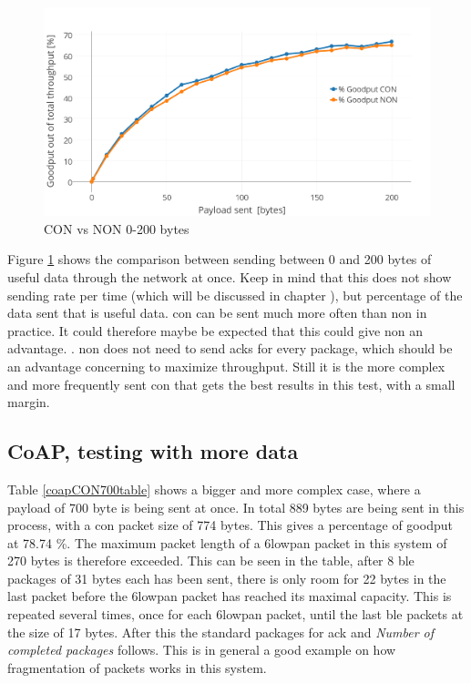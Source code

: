 



\begin{figure}[ht]
    \centering
    \includegraphics[scale=1.0]{CONvsNONplot_0-200_thicker2.png}    
    \caption{CON vs NON 0-200 bytes}
    \label{fig:CONvsNON0-200}
\end{figure}

Figure \ref{fig:CONvsNON0-200} shows the comparison between sending between 0 and 200 bytes of useful data through the network at once. Keep in mind that this does not show sending rate per time (which will be discussed in chapter ), but percentage of the data sent that is useful data. \gls{con} can be sent much more often than \gls{non} in practice. It could therefore maybe be expected that this could give \gls{non} an advantage. . \gls{non} does not need to send \glspl{ack} for every package, which should be an advantage concerning to maximize throughput. Still it is the more complex and more frequently sent \gls{con} that gets the best results in this test, with a small margin. 


\subsection{CoAP, testing with more data}

Table \ref{coapCON700table} shows a bigger and more complex case, where a payload of 700 byte is being sent at once. In total 889 bytes are being sent in this process, with a \gls{con} packet size of 774 bytes. This gives a percentage of goodput at 78.74 \%. The maximum packet length of a \gls{6lowpan} packet in this system of 270 bytes is therefore exceeded. This can be seen in the table, after 8 \gls{ble} packages of 31 bytes each has been sent, there is only room for 22 bytes in the last packet before the \gls{6lowpan} packet has reached its maximal capacity. This is repeated several times, once for each \gls{6lowpan} packet, until the last \gls{ble} packets at the size of 17 bytes. After this the standard packages for \gls{ack} and \textit{Number of completed packages} follows. This is in general a good example on how fragmentation of packets works in this system. 



